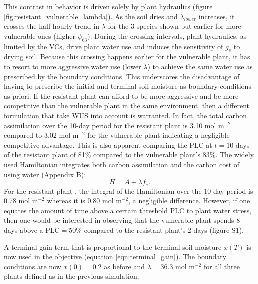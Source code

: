 \documentclass[utf8]{frontiersSCNS} %
\begin{document}
This contrast in behavior is driven solely by plant hydraulics (figure \ref{fig:resistant_vulnerable_lambda}). As the soil dries and $\lambda_{lower}$ increases, it crosses the half-hourly trend in $\lambda$ for the 3 species shown but earlier for more vulnerable ones (higher $\psi_{63}$). During the crossing intervals, plant hydraulics, as limited by the VCs, drive plant water use and induces the sensitivity of $g_s$ to drying soil. Because this crossing happens earlier for the vulnerable plant, it has to resort to more aggressive water use (lower $\lambda$) to achieve the same water use as prescribed by the boundary conditions. This underscores the disadvantage of having to prescribe the initial and terminal soil moisture as boundary conditions as priori. If the resistant plant can afford to be more aggressive and be more competitive than the vulnerable plant in the same environment, then a different formulation that take WUS into account is warranted. In fact, the total carbon assimilation over the 10-day period for the resistant plant is 3.10 mol m$^{-2}$ compared to 3.02 mol m$^{-2}$ for the vulnerable plant indicating a negligible competitive advantage. This is also apparent comparing the PLC at $t=10$ days of the resistant plant of 81\% compared to the vulnerable plant's 83\%. The widely used Hamiltonian integrates both carbon assimilation and the carbon cost of using water (Appendix B):
\begin{equation}
    \label{eqn:Hamiltionian}
    H = A + \lambda f_e.
\end{equation}
For the resistant plant , the integral of the Hamiltonian over the 10-day period is 0.78 mol m$^{-2}$ whereas it is 0.80 mol m$^{-2}$, a negligible difference. However, if one equates the amount of time above a certain threshold PLC to plant water stress, then one would be interested in observing that the vulnerable plant spends 8 days above a PLC$=50\%$ compared to the resistant plant's 2 days (figure S1).

A terminal gain term that is proportional to the terminal soil moisture $x(T)$ is now used in the objective (equation \ref{eqn:terminal_gain}). The boundary conditions are now $x(0)=0.2$ as before and $\lambda=36.3$ mol m$^{-2}$ for all three plants defined as in the previous simulation. 
\end{document}
